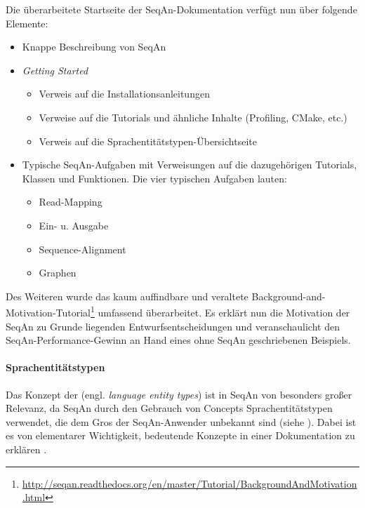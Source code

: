 Die überarbeitete Startseite der SeqAn-Dokumentation verfügt nun über folgende Elemente:
\begin{itemize}\itemsep1pt\parskip0pt
  \item Knappe Beschreibung von SeqAn
  \item \textit{Getting Started}
  \begin{itemize}
    \item Verweis auf die Installationsanleitungen
    \item Verweise auf die Tutorials und ähnliche Inhalte (Profiling, CMake, etc.)
    \item Verweis auf die Sprachentitätstypen-Übersichtseite
  \end{itemize}
  \item Typische SeqAn-Aufgaben mit Verweisungen auf die dazugehörigen Tutorials, Klassen und Funktionen. Die vier typischen Aufgaben lauten:
  \begin{itemize}
    \item Read-Mapping
    \item Ein- u. Ausgabe
    \item Sequence-Alignment
    \item Graphen
  \end{itemize}
\end{itemize}

Des Weiteren wurde das kaum auffindbare und veraltete Background-and-Motivation-Tutorial\footnote{\url{http://seqan.readthedocs.org/en/master/Tutorial/BackgroundAndMotivation.html}} umfassend überarbeitet. Es erklärt nun die Motivation der SeqAn zu Grunde liegenden Entwurfsentscheidungen und veranschaulicht den SeqAn-Performance-Gewinn an Hand eines ohne SeqAn geschriebenen Beispiels.





\paragraph{Sprachentitätstypen}

Das Konzept der  (engl. \textit{language entity types}) ist in SeqAn von besonders großer Relevanz, da SeqAn durch den Gebrauch von Concepts Sprachentitätstypen verwendet, die dem Gros der SeqAn-Anwender unbekannt sind (siehe ). Dabei ist es von elementarer Wichtigkeit, bedeutende Konzepte in einer Dokumentation zu erklären \citep{Jeong:kf,Ko:2011vw,Monperrus:2011bf}.

